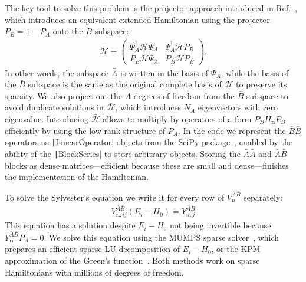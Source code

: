 The key tool to solve this problem is the projector approach introduced in Ref.~\cite{Irfan_2019}, which introduces an equivalent extended Hamiltonian using the projector $P_B = 1 - P_A$ onto the $B$ subspace:
%
\begin{align}
\bar{\mathcal{H}} = \begin{pmatrix}
\Psi_A^\dagger \mathcal{H} \Psi_A & \Psi_A^\dagger \mathcal{H} P_B \\
P_B \mathcal{H} \Psi_A & P_B \mathcal{H} P_B
\end{pmatrix}.
\end{align}
%
In other words, the subspace $\bar{A}$ is written in the basis of $\Psi_A$, while the basis of the $\bar{B}$ subspace is the same as the original complete basis of $\mathcal{H}$ to preserve its sparsity.
We also project out the $A$-degrees of freedom from the $\bar{B}$ subspace to avoid duplicate solutions in $\bar{\mathcal{H}}$, which introduces $N_A$ eigenvectors with zero eigenvalue.
Introducing $\bar{\mathcal{H}}$ allows to multiply by operators of a form $P_B H_\mathbf{n} P_B$ efficiently by using the low rank structure of $P_A$.
In the code we represent the $\bar{B}\bar{B}$ operators as \texttt|LinearOperator| objects from the SciPy package~\cite{Virtanen_2020}, enabled by the ability of the \texttt|BlockSeries| to store arbitrary objects.
Storing the $\bar{A}\bar{A}$ and $\bar{A}\bar{B}$ blocks as dense matrices---efficient because these are small and dense---finishes the implementation of the Hamiltonian.

To solve the Sylvester's equation we write it for every row of $V_n^{\bar{A}\bar{B}}$ separately:
%
\begin{align}
V_{\mathbf{n}, ij}^{\bar{A}\bar{B}} (E_i - H_0) = Y^{\bar{A} \bar{B}}_{n, j}
\end{align}
%
This equation has a solution despite $E_i - H_0$ not being invertible because $Y^{\bar{A}\bar{B}}_{\mathbf{n}} P_A = 0$.
We solve this equation using the MUMPS sparse solver~\cite{Amestoy_2001,Amestoy_2006}, which prepares an efficient sparse LU-decomposition of $E_i - H_0$, or the KPM approximation of the Green's function~\cite{Weisse_2006}.
Both methods work on sparse Hamiltonians with millions of degrees of freedom.
